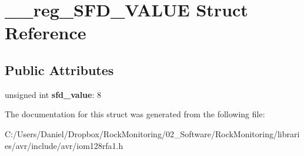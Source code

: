 \hypertarget{struct____reg___s_f_d___v_a_l_u_e}{}\section{\+\_\+\+\_\+reg\+\_\+\+S\+F\+D\+\_\+\+V\+A\+L\+UE Struct Reference}
\label{struct____reg___s_f_d___v_a_l_u_e}
\subsection*{Public Attributes}
\begin{DoxyCompactItemize}
\item 
unsigned int {\bfseries sfd\+\_\+value}\+: 8\hypertarget{struct____reg___s_f_d___v_a_l_u_e_afc0c99053135c08d52ebeef29737b52a}{}\label{struct____reg___s_f_d___v_a_l_u_e_afc0c99053135c08d52ebeef29737b52a}

\end{DoxyCompactItemize}


The documentation for this struct was generated from the following file\+:\begin{DoxyCompactItemize}
\item 
C\+:/\+Users/\+Daniel/\+Dropbox/\+Rock\+Monitoring/02\+\_\+\+Software/\+Rock\+Monitoring/libraries/avr/include/avr/iom128rfa1.\+h\end{DoxyCompactItemize}
